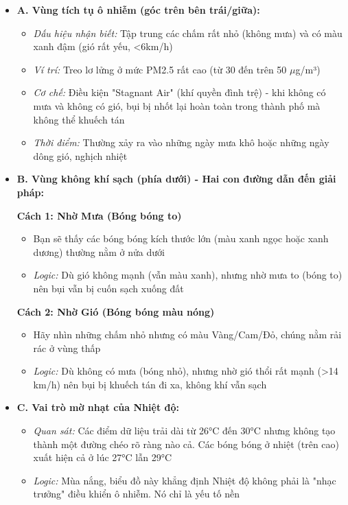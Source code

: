 \documentclass[12pt,a4paper]{article}
\begin{document}
\begin{itemize}
    \item \textbf{A. Vùng tích tụ ô nhiễm (góc trên bên trái/giữa):}
    \begin{itemize}
        \item \textit{Dấu hiệu nhận biết:} Tập trung các chấm rất nhỏ (không mưa) và có màu xanh đậm (gió rất yếu, <6km/h)
        \item \textit{Ví trí:} Treo lơ lửng ở mức PM2.5 rất cao (từ 30 đến trên 50 $\mu$g/m³)
        \item \textit{Cơ chế:} Điều kiện "Stagnant Air" (khí quyền đình trệ) - khi không có mưa và không có gió, bụi bị nhốt lại hoàn toàn trong thành phố mà không thể khuếch tán
        \item \textit{Thời điểm:} Thường xảy ra vào những ngày mưa khô hoặc những ngày dông gió, nghịch nhiệt
    \end{itemize}
    
    \item \textbf{B. Vùng không khí sạch (phía dưới) - Hai con đường dẫn đến giải pháp:}
    
    \textbf{Cách 1: Nhờ Mưa (Bóng bóng to)}
    \begin{itemize}
        \item Bạn sẽ thấy các bóng bóng kích thước lớn (màu xanh ngọc hoặc xanh dương) thường nằm ở nửa dưới
        \item \textit{Logic:} Dù gió không mạnh (vẫn màu xanh), nhưng nhờ mưa to (bóng to) nên bụi vẫn bị cuốn sạch xuống đất
    \end{itemize}
    
    \textbf{Cách 2: Nhờ Gió (Bóng bóng màu nóng)}
    \begin{itemize}
        \item Hãy nhìn những chấm nhỏ nhưng có màu Vàng/Cam/Đỏ, chúng nằm rải rác ở vùng thấp
        \item \textit{Logic:} Dù không có mưa (bóng nhỏ), nhưng nhờ gió thổi rất mạnh (>14 km/h) nên bụi bị khuếch tán đi xa, không khí vẫn sạch
    \end{itemize}
    
    \item \textbf{C. Vai trò mờ nhạt của Nhiệt độ:}
    \begin{itemize}
        \item \textit{Quan sát:} Các điểm dữ liệu trải dài từ 26°C đến 30°C nhưng không tạo thành một đường chéo rõ ràng nào cả. Các bóng bóng ở nhiệt (trên cao) xuất hiện cả ở lúc 27°C lẫn 29°C
        \item \textit{Logic:} Mùa nắng, biểu đồ này khẳng định Nhiệt độ không phải là "nhạc trưởng" điều khiển ô nhiễm. Nó chỉ là yếu tố nền
    \end{itemize}
\end{itemize}
\end{document}
